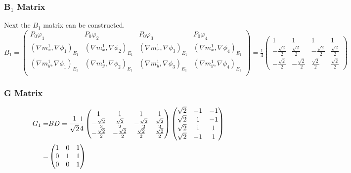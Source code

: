 \documentclass{article}
\begin{document}
\subsubsection{B$_1$ Matrix}
Next the $B_1$ matrix can be constructed.\\
$B_1 = \begin{pmatrix}
    P_0\varphi_1 & P_0\varphi_2 & P_0\varphi_3 & P_0\varphi_4\\
    (\nabla m_x^1,\nabla\phi_1)_{E_1} & (\nabla m_x^1,\nabla\phi_2)_{E_1} & (\nabla m_x^1,\nabla\phi_3)_{E_1} & (\nabla m_x^1,\nabla\phi_4)_{E_1}\\
    (\nabla m_y^1,\nabla\phi_1)_{E_1} & (\nabla m_y^1,\nabla\phi_2)_{E_1} & (\nabla m_y^1,\nabla\phi_3)_{E_1} & (\nabla m_y^1,\nabla\phi_4)_{E_1}\\
\end{pmatrix} =
\frac{1}{4}\begin{pmatrix}
    1 & 1 & 1 & 1 \\
    -\frac{\sqrt{2}}{2} & \frac{\sqrt{2}}{2} & -\frac{\sqrt{2}}{2} & \frac{\sqrt{2}}{2}\\
    -\frac{\sqrt{2}}{2} & -\frac{\sqrt{2}}{2} & \frac{\sqrt{2}}{2} & \frac{\sqrt{2}}{2}
\end{pmatrix}$

\subsubsection{G Matrix}
\begin{align*}
    G_1 =& BD =\cfrac{1}{\sqrt{2}}\frac{1}{4}
    \begin{pmatrix}
        1 & 1 & 1 & 1 \\
        -\frac{\sqrt{2}}{2} & \frac{\sqrt{2}}{2} & -\frac{\sqrt{2}}{2} & \frac{\sqrt{2}}{2}\\
        -\frac{\sqrt{2}}{2} & -\frac{\sqrt{2}}{2} & \frac{\sqrt{2}}{2} & \frac{\sqrt{2}}{2}
    \end{pmatrix}\begin{pmatrix}
        \sqrt{2} & -1 & -1\\
        \sqrt{2} & 1 & -1\\
        \sqrt{2} & 1 & 1\\
        \sqrt{2} & -1 & 1\\
    \end{pmatrix}\\
    =& \begin{pmatrix}
        1 & 0 & 1 \\
        0 & 1 & 1 \\
        0 & 0 & 1 \\
    \end{pmatrix}
\end{align*}
\end{document}
